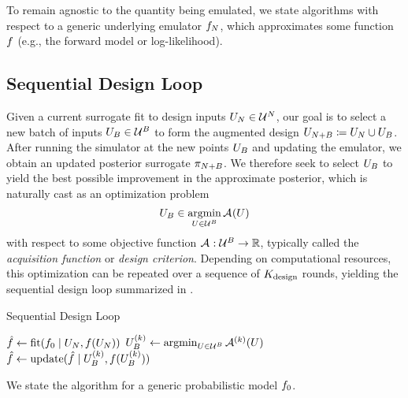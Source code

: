 \documentclass[12pt]{article}
\begin{document}
To remain agnostic to the quantity being emulated, we state algorithms with respect to
a generic underlying emulator $\funcEm[\Ndesign]$, which approximates some function
$\func$ (e.g., the forward model or log-likelihood).

\subsection{Sequential Design Loop}
Given a current surrogate fit to design inputs $\designIn[\Ndesign] \in \parSpace^{\Ndesign}$,
our goal is to select a new batch of inputs $\designBatchIn \in \parSpace^{\Nbatch}$
to form the augmented design $\designIn[\Naugment] \Def \designIn[\Ndesign] \cup \designBatchIn$.
After running the simulator at the new points $\designBatchIn$ and updating the emulator, we obtain
an updated posterior surrogate $\postEm[\Naugment]$. We therefore seek to select $\designBatchIn$
to yield the best possible improvement in the approximate posterior, which is naturally cast as 
an optimization problem
\begin{equation}
\designBatchIn \in \argmin_{\parMat \in \parSpace^{\Nbatch}} \acq[](\parMat)
\label{eq:acq-opt}
\end{equation}
with respect to some objective function $\acq[]: \parSpace^{\Nbatch} \to \R$, typically
called the \textit{acquisition function} or \textit{design criterion}.
Depending on computational resources, this optimization can be repeated over a sequence of 
$\Nrounds$ rounds, yielding the sequential design loop summarized in .
\begin{algorithm}
    \caption{Sequential Design Loop}
    \label{alg:seq-des-loop}
    \begin{algorithmic}[1] %
    	\State $\hat{\func} \gets \mathrm{fit}(\funcPrior \given \designIn[\Ndesign], \func(\designIn[\Ndesign]))$
         
        		\State $\designBatchIn^{(\designIndex)} \gets \argmin_{\parMat \in \parSpace^{\Nbatch}} \acq[]^{(\designIndex)}(\parMat)$ 
		\State $\hat{f} \gets \mathrm{update}(\hat{f} \given \designBatchIn^{(\designIndex)}, \func(\designBatchIn^{(\designIndex)}))$
	\EndFor
	\EndFunction
    \end{algorithmic}
\end{algorithm}
We state the algorithm for a generic probabilistic model $\funcPrior$. 
\end{document}

